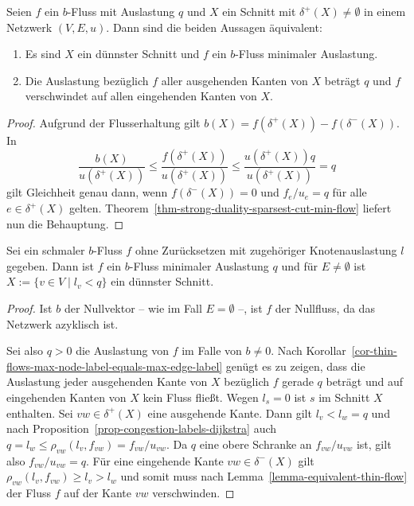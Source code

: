 \begin{corollary}\label{cor-easy-characterization-sparsest-cut}
	Seien $f$ ein $b$-Fluss mit Auslastung $q$ und $X$ ein Schnitt mit $\delta^+(X)\neq \emptyset$ in einem Netzwerk $(V, E, u)$.
	Dann sind die beiden Aussagen äquivalent:
	\begin{enumerate}[label=(\roman*)]
		\item Es sind $X$ ein dünnster Schnitt und $f$ ein $b$-Fluss minimaler Auslastung.
		\item Die Auslastung bezüglich $f$ aller ausgehenden Kanten von $X$ beträgt $q$ und $f$ verschwindet auf allen eingehenden Kanten von $X$.
	\end{enumerate}
\end{corollary}
\begin{proof}
	Aufgrund der Flusserhaltung gilt $b(X) = f(\delta^+(X)) - f(\delta^-(X))$.
	In \[
	\frac{b(X)}{u(\delta^+(X))} \leq \frac{f(\delta^+(X))}{u(\delta^+(X))} \leq \frac{u(\delta^+(X)) q}{u(\delta^+(X))} = q
	\]
	gilt Gleichheit genau dann, wenn $f(\delta^-(X))=0$ und $f_{e}/u_{e} = q$ für alle $e\in\delta^+(X)$ gelten.
	Theorem~\ref{thm-strong-duality-sparsest-cut-min-flow} liefert nun die Behauptung.
\end{proof}


\begin{lemma}\label{lemma-thin-flows-without-resetting-have-minimal-congestion}
	Sei ein schmaler $b$-Fluss $f$ ohne Zurücksetzen mit zugehöriger Knotenauslastung $l$ gegeben.
	Dann ist $f$ ein $b$-Fluss minimaler Auslastung $q$ und für $E\neq\emptyset$ ist $X:=\{ v\in V \mid l_v < q \}$ ein dünnster Schnitt.
\end{lemma}
\begin{proof}
	Ist $b$ der Nullvektor -- wie im Fall $E=\emptyset$ --, ist $f$ der Nullfluss, da das Netzwerk azyklisch ist.
	
	Sei also $q>0$ die Auslastung von $f$ im Falle von $b\neq 0$.
	Nach Korollar~\ref{cor-thin-flows-max-node-label-equals-max-edge-label} genügt es zu
	zeigen, dass die Auslastung jeder ausgehenden Kante von $X$ bezüglich $f$ gerade $q$ beträgt und auf eingehenden Kanten von $X$ kein Fluss fließt.
	Wegen $l_s=0$ ist $s$ im Schnitt $X$ enthalten.
	Sei $vw\in\delta^+(X)$ eine ausgehende Kante.
	Dann gilt $l_v < l_w = q $ und nach Proposition~\ref{prop-congestion-labels-dijkstra} auch $q = l_w \leq \rho_{vw}(l_v, f_{vw}) = f_{vw} / u_{vw}$.
	Da $q$ eine obere Schranke an $f_{vw}/u_{vw}$ ist, gilt also $f_{vw}/u_{vw} = q$.
	Für eine eingehende Kante $vw\in\delta^-(X)$ gilt $\rho_{vw}(l_v, f_{vw})\geq l_v > l_w$ und somit muss nach Lemma~\ref{lemma-equivalent-thin-flow} der Fluss $f$ auf der Kante $vw$ verschwinden.
\end{proof}


